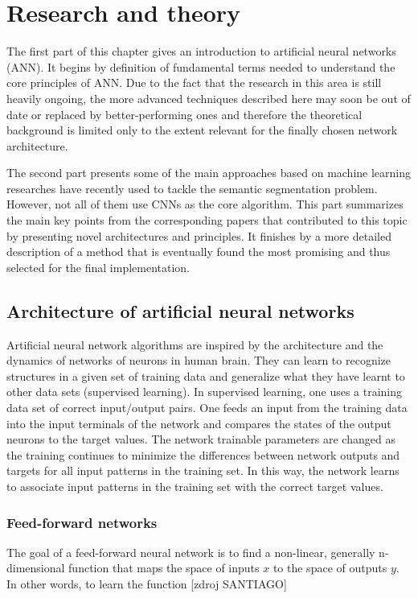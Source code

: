 \chapter{Research and theory}
\label{research}
The first part of this chapter gives an introduction to artificial neural networks (ANN). It begins by definition of fundamental terms needed to understand the core principles of ANN. Due to the fact that the research in this area is still heavily ongoing, the more advanced techniques described here may soon be out of date or replaced by better-performing ones and therefore the theoretical background is limited only to the extent relevant for the finally chosen network architecture. 

The second part presents some of the main approaches based on machine learning researches have recently used to tackle the semantic segmentation problem. However, not all of them use CNNs as the core algorithm. This part summarizes the main key points from the corresponding papers that contributed to this topic by presenting novel architectures and principles. It finishes by a more detailed description of a method that is eventually found the most promising and thus selected for the final implementation.

\section{Architecture of artificial neural networks}
Artificial neural network algorithms are inspired by the architecture and the dynamics
of networks of neurons in human brain. They can learn to recognize structures in a given set of training data and generalize what they have learnt to other data sets (supervised learning). In supervised learning, one uses a training data set of correct input/output pairs. One feeds an input from the training data into the input terminals of the network and compares the states of the output neurons to the target values. The network trainable parameters are changed as the training continues to minimize the differences between network outputs and targets for all input patterns in the training set. In this way, the network learns to associate input patterns in the training set with the correct target values. 

\subsection{Feed-forward networks}

The goal of a feed-forward neural network is to find a non-linear, generally n-dimensional function that maps the space of inputs $ x $ to the space of outputs $ y $. In other words, to learn the function [zdroj SANTIAGO]

